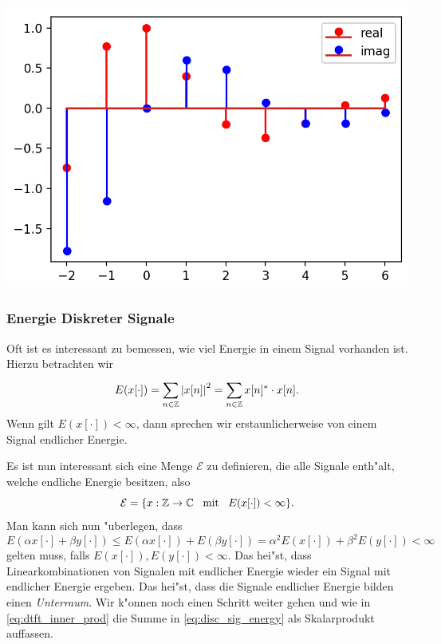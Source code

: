 %
\begin{listing}
    \noindent
    \begin{minipage}{0.49\textwidth}
        \strut\vspace*{-\baselineskip}\newline
        \inputminted[firstline=4]{python3}{code/complex_exp.py}
    \end{minipage}%
    \begin{minipage}{0.49\textwidth}
        \strut\vspace*{-\baselineskip}\newline
        \includegraphics[width=\textwidth]{code/complex_exp.png}
    \end{minipage}
    \label{py:complex_exp}
\end{listing}
%
\subsubsection{Energie Diskreter Signale}

Oft ist es interessant zu bemessen, wie viel Energie in einem Signal vorhanden ist.
Hierzu betrachten wir
\begin{equation}\label{eq:disc_sig_energy}
    E(x[\cdot]) 
        = {\sum\limits_{n \in \mathbb{Z}}^{}{{\left| x[n] \right|}^2}} 
        = {\sum\limits_{n \in \mathbb{Z}}^{}{x[n]^\ast \cdot x[n]}}.
\end{equation}
Wenn gilt $E(x[\cdot]) < \infty$, dann sprechen wir erstaunlicherweise von einem Signal endlicher Energie.

Es ist nun interessant sich eine Menge $\mathcal{E}$ zu definieren, die alle Signale enth"alt, welche endliche Energie besitzen, also 
\[
    \mathcal{E} = \{x : \mathbb{Z} \rightarrow \mathbb{C} {\hspace{3mm} \text{mit} \hspace{3mm}} E(x[\cdot]) < \infty\}.
\]
Man kann sich nun "uberlegen, dass
\[
E(\alpha x[\cdot] + \beta y[\cdot]) 
    \leqslant E(\alpha x[\cdot]) + E(\beta y[\cdot])
    = \alpha^2 E(x[\cdot]) + \beta^2 E(y[\cdot]) 
    < \infty 
\]
gelten muss, falls $E(x[\cdot]),E(y[\cdot]) < \infty$. 
Das hei"st, dass Linearkombinationen von Signalen mit endlicher Energie wieder ein Signal mit endlicher Energie ergeben.
Das hei"st, dass die Signale endlicher Energie bilden einen \emph{Unterraum}.
Wir k"onnen noch einen Schritt weiter gehen und wie in \eqref{eq:dtft_inner_prod} die Summe in \eqref{eq:disc_sig_energy} als Skalarprodukt auffassen.

